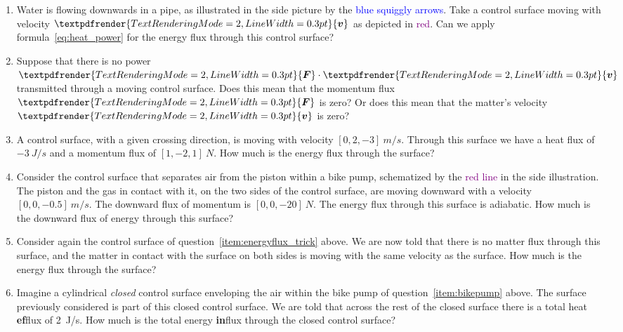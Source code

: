 \documentclass[a4paper,12pt,%
onecolumn,oneside,titlepage,%
british%
]{memoir}
\renewcommand*{\bm}[1]{\textpdfrender{TextRenderingMode=2,LineWidth=0.3pt}{\boldsymbol{#1}}}
\renewcommand*{\|}[1][]{\nonscript\:#1\vert\nonscript\:\mathopen{}}
\newcommand*{\yv}{\bm{v}}
\newcommand*{\yF}{\bm{F}}
\begin{document}
\begin{exercise}
  \begin{enumerate}[exerc]
  \item Water is flowing downwards in a pipe, as illustrated in the side picture by the \textcolor{blue}{blue squiggly arrows}. Take a control surface moving with velocity $\yv$ as depicted in \textcolor{purple}{red}. Can we apply  formula~\eqref{eq:heat_power} for the energy flux through this control surface?

  \item Suppose that there is no power $\yF\cdot\yv$ transmitted through a moving control surface. Does this mean that the momentum flux $\yF$ is zero? Or does this mean that the matter's velocity $\yv$ is zero?

  \item\label{item:energyflux_trick} A control surface, with a given crossing direction, is moving with velocity $[0,2,-3]\:\unit{m/s}$. Through this surface we have a heat flux of $\qty{-3}{J/s}$ and a momentum flux of $[1,-2,1]\:\unit{N}$. How much is the energy flux through the surface?

  \item\label{item:bikepump} Consider the control surface that separates air from the piston within a bike pump, schematized by the \textcolor{purple}{red line} in the side illustration. The piston and the gas in contact with it, on the two sides of the control surface, are moving downward with a velocity $[0,0,-0.5]\:\unit{m/s}$. The downward flux of momentum is $[0,0,-20]\:\unit{N}$. The energy flux through this surface is adiabatic. How much is the downward flux of energy through this surface?

  \item Consider again the control surface of question~\ref{item:energyflux_trick} above. We are now told that there is no matter flux through this surface, and the matter in contact with the surface on both sides is moving with the same velocity as the surface. How much is the energy flux through the surface?

  \item Imagine a cylindrical \emph{closed} control surface enveloping the air within the bike pump of question~\ref{item:bikepump} above. The surface previously considered is part of this closed control surface. We are told that across the rest of the closed surface there is a total heat \textbf{ef}flux of \qty{2}{J/s}. How much is the total energy \textbf{in}flux through the closed control surface?
  \end{enumerate}
\end{exercise}
\end{document}
